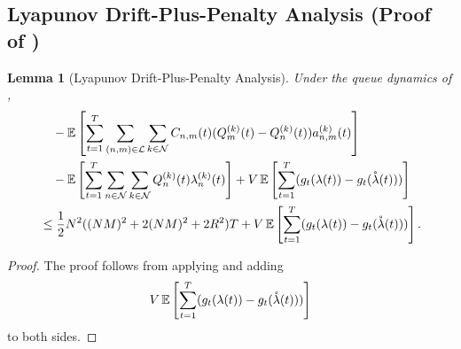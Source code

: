 \documentclass[11pt,fullpage,letterpaper]{article} %
\newtheorem{lemma}[theorem]{Lemma}
\renewcommand{\bm}[1]{#1}%
\newcommand{\E}{\operatornamewithlimits{\mathbb{E}}}
\newcommand{\mN}{{\mathcal N}}
\newcommand{\mL}{{\mathcal L}}
\begin{document}
\subsection{Lyapunov Drift-Plus-Penalty Analysis (Proof of )}\label{sec:multi-hop utility Lyapunov appendix}
\begin{lemma}[Lyapunov Drift-Plus-Penalty Analysis]\label{lem:multi-hop utility Lyapunov}
Under the queue dynamics of ,
\begin{align*}
&\quad -\E\left [\sum_{t=1}^T \sum_{(n,m)\in \mL} \sum_{k\in \mN} C_{n,m}(t) (Q_m^{(k)}(t)-Q_n^{(k)}(t))a_{n,m}^{(k)}(t)\right ] \nonumber\\
&\quad -\E\left [\sum_{t=1}^T \sum_{n\in \mN} \sum_{k\in \mN} Q_n^{(k)}(t) \lambda_n^{(k)}(t)\right ]+V \E\left [\sum_{t=1}^T (g_t(\bm \lambda(t))-g_t(\mathring{\bm \lambda}(t)))\right ] \nonumber\\
&\le \frac 12 N^2 ((NM)^2+2(NM)^2+2R^2)T +V  \E\left [\sum_{t=1}^T (g_t(\bm \lambda(t))-g_t(\mathring{\bm \lambda}(t)))\right ].
\end{align*}
\end{lemma}
\begin{proof}
The proof follows from applying  and adding
\begin{equation*}
V  \E\left [\sum_{t=1}^T (g_t(\bm \lambda(t))-g_t(\mathring{\bm \lambda}(t)))\right ]
\end{equation*}
to both sides.
\end{proof}
\end{document}
